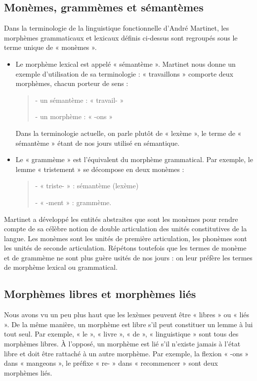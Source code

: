 \subsection{Monèmes, grammèmes et sémantèmes}
Dans la terminologie de la linguistique fonctionnelle d’André Martinet, les morphèmes grammaticaux et lexicaux définis ci-dessus sont regroupés sous le terme unique de « monèmes ».
\begin{itemize}
\item Le morphème lexical est appelé « sémantème ». Martinet nous donne un exemple d’utilisation de sa terminologie : « travaillons » comporte deux morphèmes, chacun porteur de sens :
\begin{quote}
- un sémantème : « travail- »

- un morphème : « -ons »
\end{quote}
Dans la terminologie actuelle, on parle plutôt de « lexème », le terme de « sémantème » étant de nos jours utilisé en sémantique.
\item Le « grammème » est l’équivalent du morphème grammatical. Par exemple, le lemme « tristement » se décompose en deux monèmes :
\begin{quote}
- « triste- » : sémantème (lexème)

- « -ment » : grammème.
\end{quote}
\end{itemize}
Martinet a développé les entités abstraites que sont les monèmes pour rendre compte de sa célèbre notion de double articulation des unités constitutives de la langue. Les monèmes sont les unités de première articulation, les phonèmes sont les unités de seconde articulation. Répétons toutefois que les termes de monème et de grammème ne sont plus guère usités de nos jours : on leur préfère les termes de morphème lexical ou grammatical.

\subsection{Morphèmes libres et morphèmes liés}
Nous avons vu un peu plus haut que les lexèmes peuvent être « libres » ou « liés ». De la même manière, un morphème est libre s’il peut constituer un lemme à lui tout seul. Par exemple, « le », « livre », « de », « linguistique » sont tous des morphèmes libres. À l’opposé, un morphème est lié s’il n’existe jamais à l’état libre et doit être rattaché à un autre morphème. Par exemple, la flexion « -ons » dans « mangeons », le préfixe « re- » dans « recommencer » sont deux morphèmes liés.

